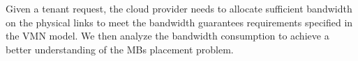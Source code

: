 \documentclass[review]{elsarticle}
\begin{document}

Given a tenant request, the cloud provider needs to allocate sufficient bandwidth on the physical links to meet the bandwidth guarantees requirements specified in the VMN model. We then analyze the bandwidth consumption to achieve a better understanding of the MBs placement problem. 
\end{document}
